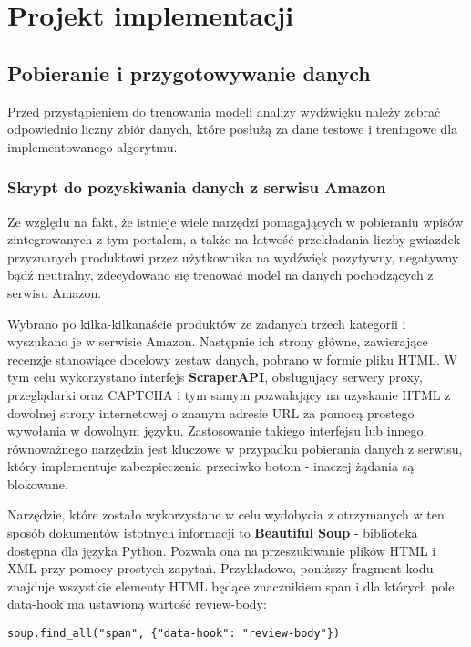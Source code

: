 \newpage
\section{Projekt implementacji}

\subsection{Pobieranie i przygotowywanie danych}

Przed przystąpieniem do trenowania modeli analizy wydźwięku należy zebrać odpowiednio liczny zbiór danych, które posłużą za dane testowe i treningowe dla implementowanego algorytmu.

\subsubsection{Skrypt do pozyskiwania danych z serwisu Amazon}

Ze względu na fakt, że istnieje wiele narzędzi pomagających w pobieraniu wpisów zintegrowanych z tym portalem, a także na łatwość przekładania liczby gwiazdek przyznanych produktowi przez użytkownika na wydźwięk pozytywny, negatywny bądź neutralny, zdecydowano się trenować model na danych pochodzących z serwisu Amazon.

Wybrano po kilka-kilkanaście produktów ze zadanych trzech kategorii i wyszukano je w serwisie Amazon. Następnie ich strony główne, zawierające recenzje stanowiące docelowy zestaw danych, pobrano w formie pliku HTML. W tym celu wykorzystano interfejs \textbf{ScraperAPI}, obsługujący serwery proxy, przeglądarki oraz CAPTCHA i tym samym pozwalający na uzyskanie HTML z dowolnej strony internetowej o znanym adresie URL za pomocą prostego wywołania w dowolnym języku. Zastosowanie takiego interfejsu lub innego, równoważnego narzędzia jest kluczowe w przypadku pobierania danych z serwisu, który implementuje zabezpieczenia przeciwko botom - inaczej żądania są blokowane.

Narzędzie, które zostało wykorzystane w celu wydobycia z otrzymanych w ten sposób dokumentów istotnych informacji to \textbf{Beautiful Soup} - biblioteka dostępna dla języka Python. Pozwala ona na przeszukiwanie plików HTML i XML przy pomocy prostych zapytań. Przykładowo, poniższy fragment kodu znajduje wszystkie elementy HTML będące znacznikiem span i dla których pole data-hook ma ustawioną wartość review-body: %

\begin{lstlisting}
soup.find_all("span", {"data-hook": "review-body"})
\end{lstlisting}

